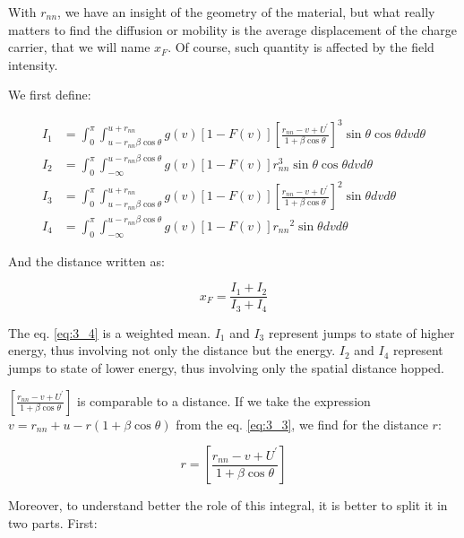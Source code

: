 With $r_{nn}$, we have an insight of the geometry of the material, but what really matters to find the diffusion or mobility is the average displacement of the charge carrier, that we will name $x_F$. Of course, such quantity is affected by the field intensity.

We first define:

\begin{equation}
    \begin{aligned}
    I_{1}&=\int_{0}^{\pi} \int_{u - r_{nn}\beta\cos \theta}^{u + r_{nn}} g(v)\left[1-F(v)\right]\left[\frac{r_{nn}-v+U^{\prime}}{1+\beta \cos \theta}\right]^{3} \sin \theta \cos \theta d v d \theta\\
    I_{2}&=\int_{0}^{\pi} \int_{-\infty}^{u - r_{nn}\beta\cos \theta} g(v)\left[1-F(v)\right] {r}_{n n}^{3} \sin \theta \cos \theta d v d \theta\\
    I_{3}&=\int_{0}^{\pi} \int_{u - r_{nn}\beta\cos \theta}^{u + r_{nn}} g(v)\left[1-F(v)\right]\left[\frac{r_{nn}-v+U^{\prime}}{1+\beta \cos \theta}\right]^{2} \sin \theta d v d \theta\\
    I_{4}&=\int_{0}^{\pi} \int_{-\infty}^{u - r_{nn}\beta\cos \theta} g(v)\left[1-F(v)\right] r_{nn}{ }^{2} \sin \theta d v d \theta
    \label{eq:3_I}
    \end{aligned}
\end{equation}

And the distance written as:

\begin{equation}
    x_F = \frac{I_1 + I_2}{I_3 + I_4}
    \label{eq:3_4}
\end{equation}

The eq. \ref{eq:3_4} is a weighted mean. $I_1$ and $I_3$ represent jumps to state of higher energy, thus involving not only the distance but the energy. $I_2$ and $I_4$ represent jumps to state of lower energy, thus involving only the spatial distance hopped.

$\left[\frac{r_{nn}-v+U^{\prime}}{1+\beta \cos \theta}\right]$ is comparable to a distance. If we take the expression $v = r_{nn}+u-r(1+\beta \cos \theta)$ from the eq. \ref{eq:3_3}, we find for the distance $r$:

\begin{equation}
    r = \left[\frac{r_{nn}-v+U^{\prime}}{1+\beta \cos \theta}\right]
\end{equation}

Moreover, to understand better the role of this integral, it is better to split it in two parts. First:

